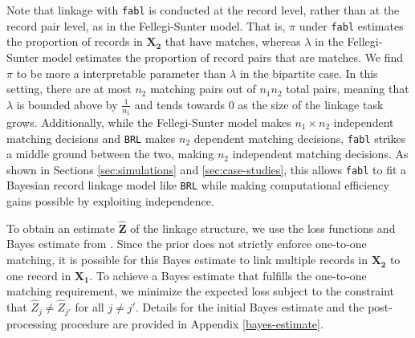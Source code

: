 \documentclass[ba]{imsart}
\begin{document}
Note that linkage with \texttt{fabl} is conducted at the record level, rather than at the record pair level, as in the Fellegi-Sunter model. That is, $\pi$ under \texttt{fabl} estimates the proportion of records in $\bm{X_2}$ that have matches, whereas $\lambda$ in the Fellegi-Sunter model estimates the proportion of record pairs that are matches. We find $\pi$ to be more a interpretable parameter than $\lambda$ in the bipartite case. In this setting, there are at most $n_2$ matching pairs out of $n_1 n_2$ total pairs, meaning that $\lambda$ is bounded above by $\frac{1}{n_1}$ and tends towards 0 as the size of the linkage task grows. Additionally, while the Fellegi-Sunter model makes $n_1 \times n_2$ independent matching decisions and \texttt{BRL} makes $n_2$ dependent matching decisions, \texttt{fabl} strikes a middle ground between the two, making $n_2$  independent matching decisions. As shown in Sections \ref{sec:simulations} and \ref{sec:case-studies}, this allows \texttt{fabl} to fit a Bayesian record linkage model like \texttt{BRL} while making computational efficiency gains possible by exploiting independence. 


To obtain an estimate $\hat{\bm{Z}}$ of the linkage structure, we use the loss functions and Bayes estimate from \cite{sadinle_bayesian_2017}. Since the prior does not strictly enforce one-to-one matching, it is possible for this Bayes estimate to link multiple records in $\bm{X_2}$ to one record in $\bm{X_1}$. To achieve a Bayes estimate that fulfills the one-to-one matching requirement, we minimize the expected loss subject to the constraint that $\hat{Z}_j \neq \hat{Z}_{j'}$ for all $j \neq j'$. Details for the initial Bayes estimate and the post-processing procedure are provided in Appendix \ref{bayes-estimate}.
\end{document}
